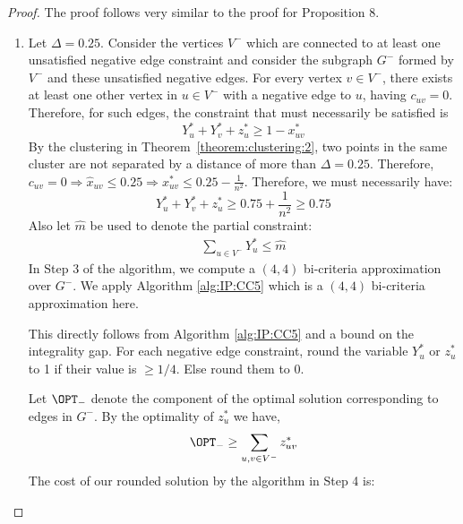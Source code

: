\begin{proof}
The proof follows very similar to the proof for Proposition 8.
\begin{enumerate}
    \item Let $\Delta=0.25$. Consider the vertices $V^-$ which are connected to at least one unsatisfied negative edge constraint and consider the subgraph $G^-$ formed by $V^-$ and these unsatisfied negative edges. For every vertex $v \in V^-$, there exists at least one other vertex in $u \in V^-$ with a negative edge to $u$, having $c_{uv} = 0$. Therefore, for such edges, the constraint that must necessarily be satisfied is
	\begin{equation*}
        Y_u^* + Y_v^* + z_{u}^* \ge 1 - x^*_{uv}
	\end{equation*}
	By the clustering in Theorem~\ref{theorem:clustering:2}, two points in the same cluster are not separated by a distance of more than $\Delta = 0.25$. Therefore, $c_{uv} = 0 \Rightarrow \hat{x}_{uv} \le 0.25 \Rightarrow x_{uv}^* \le 0.25 - \frac{1}{n^2}$. Therefore, we must necessarily have:
	\begin{equation} \label{eq:006}
		Y_u^* + Y_v^* + z_{u}^* \ge 0.75 + \frac{1}{n^2} \ge 0.75
	\end{equation}
	Also let $\hat{m}$ be used to denote the partial constraint:
	\begin{align*}
	    \sum_{u\in V^-} Y_u^* \leq \hat{m}
	\end{align*}
	In Step 3 of the algorithm, we compute a $(4,4)$ bi-criteria approximation over $G^-$. We apply Algorithm \ref{alg:IP:CC5} which is a $(4,4)$ bi-criteria approximation here.
	\begin{algorithm} This directly follows from Algorithm \ref{alg:IP:CC5} and a bound on the integrality gap. For each negative edge constraint, round the variable $Y_u^*$ or $z_u^*$ to 1 if their value is $\geq 1/4$. Else round them to $0$.
	\end{algorithm}
	Let $\OPT_-$ denote the component of the optimal solution corresponding to edges in $G^-$. By the optimality of $z^*_u$ we have,
	\begin{align}
	\OPT_- \ge \sum_{u,v \in V^-} z^*_{uv} \label{eq:007}
	\end{align}
	The cost of our rounded solution by the algorithm in Step 4 is:
	\begin{equation*}

\end{equation*}
\end{enumerate}
\end{proof}
